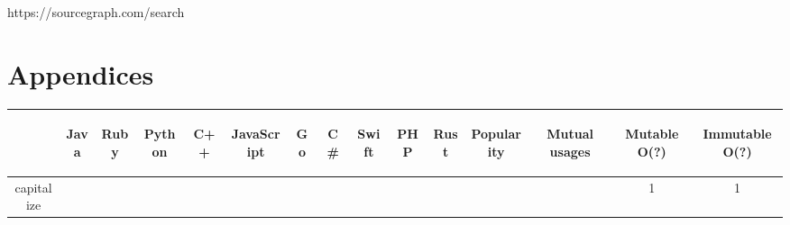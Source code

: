 \documentclass[anonymous,sigplan,review,11pt,nonacm,natbib=false]{acmart}
\begin{document}
    https://sourcegraph.com/search

    \section{Appendices}

    \label{table 1}

    \begin{table*}[]
        \centering
        \begin{tabular}{|c||c|c|c|c|c|c|c|c|c|c|c|c|c|c|}
            \hline
            & \begin{sideways}Java\end{sideways}
            & \begin{sideways}Ruby\end{sideways}
            & \begin{sideways}Python\end{sideways}
            & \begin{sideways}C++\end{sideways}
            & \begin{sideways}JavaScript\end{sideways}
            & \begin{sideways}Go\end{sideways}
            & \begin{sideways}C\#\end{sideways}
            & \begin{sideways}Swift\end{sideways}
            & \begin{sideways}PHP\end{sideways}
            & \begin{sideways}Rust\end{sideways}
            & \begin{sideways}Popularity\end{sideways}
            & \begin{sideways}Mutual usages\end{sideways}
            & \begin{sideways}Mutable O(?)\end{sideways}
            & \begin{sideways}Immutable O(?)\end{sideways}
            \\ \hline \hline
            capitalize &  &  &  &  &  &  &  &  &  &  &  &  & 1 & 1 \\ \hline


\end{tabular}
\end{table*}
\end{document}
